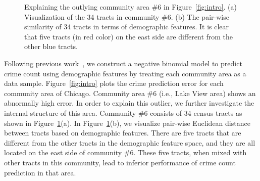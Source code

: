\begin{figure}
\centering
{}
\caption{Explaining the outlying community area \#6 in Figure~\ref{fig:intro}. (a) Visualization of the 34 tracts in community \#6. (b) The pair-wise similarity of 34 tracts in terms of demographic features. It is clear that five tracts (in red color) on the east side are different from the other blue tracts.}
\label{fig:intro-explain}
\end{figure}

\begin{example}
Following previous work~\cite{wang2016crime}, we construct a negative binomial model to predict crime count using demographic features by treating each community area as a data sample. Figure~\ref{fig:intro} plots the crime prediction error for each community area of Chicago. Community area \#6 (i.e., Lake View area) shows an abnormally high error. In order to explain this outlier, we further investigate the internal structure of this area. Community \#6 consists of 34 census tracts as shown in Figure~\ref{fig:intro-explain}(a).  In Figure~\ref{fig:intro-explain}(b), we visualize  pair-wise Euclidean distance between tracts based on demographic features. There are five tracts that are different from the other tracts in the demographic feature space, and they are all located on the east side of community \#6. These five tracts, when mixed with other tracts in this community, lead to inferior performance of crime count prediction in that area. 
\end{example}


